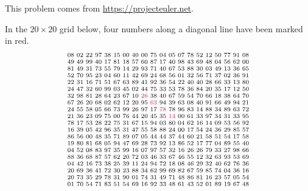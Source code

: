 \begin{problem} %
This problem comes from \url{https://projecteuler.net}.

In the $20 \times 20$ grid below, four numbers along a diagonal line have been marked in red.
%
\begin{align*}
\centering
\scriptsize{\arraycolsep=1.4pt\begin{array}{cccccccccccccccccccc}
08&02&22&97&38&15&00&40&00&75&04&05&07&78&52&12&50&77&91&08\\
49&49&99&40&17&81&18&57&60&87&17&40&98&43&69&48&04&56&62&00\\
81&49&31&73&55&79&14&29&93&71&40&67&53&88&30&03&49&13&36&65\\
52&70&95&23&04&60&11&42&69&24&68&56&01&32&56&71&37&02&36&91\\
22&31&16&71&51&67&63&89&41&92&36&54&22&40&40&28&66&33&13&80\\
24&47&32&60&99&03&45&02&44&75&33&53&78&36&84&20&35&17&12&50\\
32&98&81&28&64&23&67&10&\textcolor{red}{26}&38&40&67&59&54&70&66&18&38&64&70\\
67&26&20&68&02&62&12&20&95&\textcolor{red}{63}&94&39&63&08&40&91&66&49&94&21\\
24&55&58&05&66&73&99&26&97&17&\textcolor{red}{78}&78&96&83&14&88&34&89&63&72\\
21&36&23&09&75&00&76&44&20&45&35&\textcolor{red}{14}&00&61&33&97&34&31&33&95\\
78&17&53&28&22&75&31&67&15&94&03&80&04&62&16&14&09&53&56&92\\
16&39&05&42&96&35&31&47&55&58&88&24&00&17&54&24&36&29&85&57\\
86&56&00&48&35&71&89&07&05&44&44&37&44&60&21&58&51&54&17&58\\
19&80&81&68&05&94&47&69&28&73&92&13&86&52&17&77&04&89&55&40\\
04&52&08&83&97&35&99&16&07&97&57&32&16&26&26&79&33&27&98&66\\
88&36&68&87&57&62&20&72&03&46&33&67&46&55&12&32&63&93&53&69\\
04&42&16&73&38&25&39&11&24&94&72&18&08&46&29&32&40&62&76&36\\
20&69&36&41&72&30&23&88&34&62&99&69&82&67&59&85&74&04&36&16\\
20&73&35&29&78&31&90&01&74&31&49&71&48&86&81&16&23&57&05&54\\
01&70&54&71&83&51&54&69&16&92&33&48&61&43&52&01&89&19&67&48
\end{array}}
\end{align*}


\end{problem}
